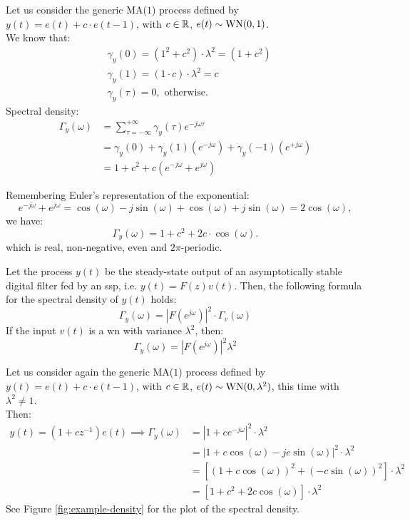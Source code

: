 \begin{example}
Let us consider the generic MA($1$) process defined by $y(t)=e(t)+c \cdot e(t-1)$, with $c \in \mathbb{R}$, $e(t)\sim \operatorname{WN}(0,1)$.\\
We know that:
\begin{align*}
	&\gamma_{y}(0)=(1^{2}+c^{2})\cdot \lambda^{2}=(1+c^{2})\\
	&\gamma_{y}(1)=(1 \cdot c) \cdot \lambda^{2}=c \\
	&\gamma_{y}(\tau)=0, \text{ otherwise.}
\end{align*}
Spectral density:
\begin{align*}
	\Gamma_{y}(\omega)&=\sum_{\tau=-\infty}^{+\infty} \gamma_{y}(\tau) e^{-j \omega \tau}\\
	&=\gamma_{y}(0)+\gamma_{y}(1)(e^{-j \omega})+\gamma_{y}(-1)(e^{+j \omega}) \\
	&=1+c^{2}+c(e^{-j \omega}+e^{j \omega})
\end{align*}

Remembering Euler's representation of the exponential:
$$
	e^{-j \omega}+e^{j \omega}=\cos (\omega)-j \sin (\omega)+\cos (\omega)+j \sin (\omega)=2 \cos (\omega),
$$
we have:
$$
	\Gamma_y(\omega)=1+c^{2}+2 c \cdot \cos (\omega).
$$
which is real, non-negative, even and $2 \pi$-periodic.
\end{example}
Let the process $y(t)$ be the steady-state output of an asymptotically stable digital filter fed by an \gls{ssp}, i.e. $y(t)=F(z) v(t)$. Then, the following formula for the spectral density of $y(t)$ holds:
\[
	\boxed{\Gamma_{y}(\omega)=|F(e^{j \omega})|^{2} \cdot \Gamma_{v}(\omega)}
\]
If the input $v(t)$ is a \gls{wn} with variance $\lambda^{2}$, then:
$$
\Gamma_{y}(\omega)=|F(e^{j \omega})|^{2} \lambda^{2}
$$

Let us consider again the generic MA($1$) process defined by $y(t)=e(t)+c \cdot e(t-1)$, with $c \in \mathbb{R}$, $e(t)\sim \operatorname{WN}(0,\lambda^2)$, this time with $\lambda^2 \neq 1$.\\
Then:
\begin{align*}
	y(t)=\left(1+c z^{-1}\right) e(t) \implies \Gamma_{y}(\omega)&=\left|1+c e^{-j \omega}\right|^{2} \cdot \lambda^{2}\\
	&=\left|1+c \cos (\omega)-j c\sin (\omega)\right|^{2}\cdot\lambda^2\\
	&=[\left(1+c \cos (\omega)\right)^2+\left(-c\sin (\omega)\right)^2]\cdot\lambda^2\\
	&=[1+c^{2}+2 c \cos (\omega)]\cdot\lambda^2
\end{align*}
See Figure \ref{fig:example-density} for the plot of the spectral density.

